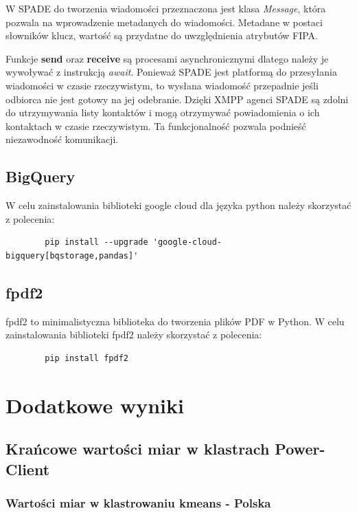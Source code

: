 \documentclass[11pt]{report}
\begin{document}
    W SPADE do tworzenia wiadomości przeznaczona jest klasa \textit{Message},
    która pozwala na wprowadzenie metadanych do wiadomości.
    Metadane w postaci słowników klucz, wartość są przydatne do uwzględnienia atrybutów FIPA\@.

    Funkcje \textbf{send} oraz \textbf{receive} są procesami asynchronicznymi dlatego należy je wywoływać z instrukcją \textit{await}.
    Ponieważ SPADE jest platformą do przesyłania wiadomości w czasie rzeczywistym,
    to wysłana wiadomość przepadnie jeśli odbiorca nie jest gotowy na jej odebranie.
    Dzięki XMPP agenci SPADE są zdolni do utrzymywania listy kontaktów i mogą otrzymywać powiadomienia o ich kontaktach w czasie rzeczywistym.
    Ta funkcjonalność pozwala podnieść niezawodność komunikacji.


    \section{BigQuery}
    W celu zainstalowania biblioteki google cloud dla języka python należy skorzystać z polecenia:
    \begin{verbatim}
        pip install --upgrade 'google-cloud-bigquery[bqstorage,pandas]'
    \end{verbatim}


    \section{fpdf2}
    fpdf2 to minimalistyczna biblioteka do tworzenia plików PDF w Python.
    W celu zainstalowania biblioteki fpdf2 należy skorzystać z polecenia:
    \begin{verbatim}
        pip install fpdf2
    \end{verbatim}


    \chapter{Dodatkowe wyniki}


    \section{Krańcowe wartości miar w klastrach Power-Client}

    \subsection{Wartości miar w klastrowaniu kmeans - Polska}\label{subsec:wartości-miar-w-klastrowaniu-kmeans---polska}
\end{document}
